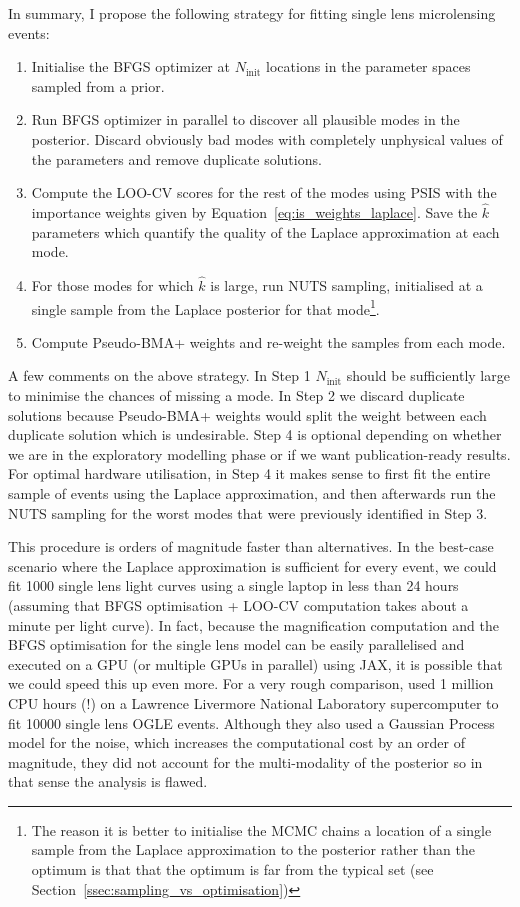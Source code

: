 \documentclass[12pt,dvipsnames]{report}
\newcommand{\ssf}[1]{\textsf{#1}}
\begin{document}
In summary, I propose the following strategy for fitting single lens 
microlensing events:
\begin{enumerate}
    \item Initialise the BFGS optimizer at $N_\mathrm{init}$ locations in the parameter
    spaces sampled from a prior. 
    \item Run BFGS optimizer in parallel to discover all plausible modes in the 
    posterior. Discard obviously bad modes with completely unphysical values of 
    the parameters and remove duplicate solutions.
    \item Compute the LOO-CV scores for the rest of the modes using PSIS with the 
    importance weights given by Equation~\ref{eq:is_weights_laplace}. Save the $\hat k$ 
    parameters which quantify the quality of the Laplace approximation at each mode.
    \item For those modes for which $\hat k$ is large, run NUTS sampling, initialised 
    at a single sample from the Laplace posterior for that mode\footnote{The reason it
    is better to initialise the MCMC chains a location of a single sample
    from the Laplace approximation to the posterior rather than the optimum is that 
    that the optimum is far from the typical set 
    (see Section~\ref{ssec:sampling_vs_optimisation})}.
    \item Compute Pseudo-BMA+ weights and re-weight the samples from each mode.
\end{enumerate}
A few comments on the above strategy.
In Step 1 $N_\mathrm{init}$ should be sufficiently  large to minimise the chances of 
missing a mode. In Step 2 we discard duplicate solutions because Pseudo-BMA+ 
weights would split the weight between each duplicate solution which is undesirable. 
Step 4 is optional depending on whether we are in the exploratory modelling phase or 
if we want publication-ready results. For optimal hardware utilisation, in Step 4 
it makes  sense to first fit the entire sample  of events using the Laplace 
approximation, and then afterwards run the NUTS sampling for the worst modes 
that were previously identified in Step 3.

This procedure is orders of magnitude faster than alternatives. 
In the best-case scenario where the Laplace approximation is sufficient for every event,
we could fit 1000 single lens light curves using a single laptop in less than 
24 hours (assuming that BFGS optimisation + LOO-CV computation takes about a 
minute per light curve). In fact, because the magnification computation and the BFGS
optimisation for the single lens model can be easily parallelised and executed on a
GPU (or multiple GPUs in parallel) using \ssf{JAX}, it is possible that we could 
speed this up even more. 
For a very rough comparison, \citep{golovich2022} used 1 million CPU hours (!) on a 
Lawrence Livermore National Laboratory supercomputer to fit 10000 single lens 
OGLE events. Although they also used a Gaussian Process model for the noise, which 
increases the computational cost by an order of magnitude, they did not account 
for the multi-modality of the posterior so in that sense the analysis is flawed.
\end{document}
